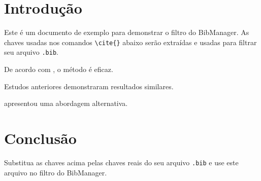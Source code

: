 \documentclass[12pt]{article}
\begin{document}
\section{Introdução}
Este é um documento de exemplo para demonstrar o filtro do BibManager.
As chaves usadas nos comandos \verb|\cite{}| abaixo serão extraídas
e usadas para filtrar seu arquivo \texttt{.bib}.


\cite{exemplo_artigo_2022}

De acordo com \textcite{exemplo_livro_2020}, o método é eficaz.

Estudos anteriores \citep{exemplo_conferencia_2021, exemplo_artigo_2019}
demonstraram resultados similares.

\citet{exemplo_tese_2023} apresentou uma abordagem alternativa.

\section{Conclusão}
Substitua as chaves acima pelas chaves reais do seu arquivo \texttt{.bib}
e use este arquivo no filtro do BibManager.


\end{document}
